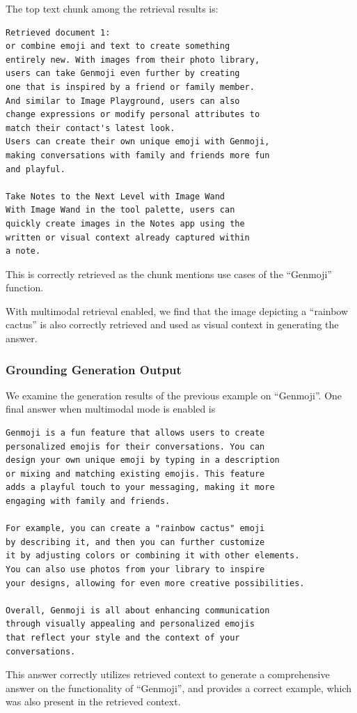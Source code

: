The top text chunk among the retrieval results is:
\begin{verbatim}
Retrieved document 1: 
or combine emoji and text to create something 
entirely new. With images from their photo library, 
users can take Genmoji even further by creating 
one that is inspired by a friend or family member. 
And similar to Image Playground, users can also 
change expressions or modify personal attributes to 
match their contact's latest look.
Users can create their own unique emoji with Genmoji, 
making conversations with family and friends more fun 
and playful.

Take Notes to the Next Level with Image Wand
With Image Wand in the tool palette, users can 
quickly create images in the Notes app using the 
written or visual context already captured within 
a note.
\end{verbatim}
This is correctly retrieved as the chunk mentions use cases of the ``Genmoji'' function.

With multimodal retrieval enabled, we find that the image depicting a ``rainbow cactus'' is also 
correctly retrieved and used as visual context in generating the answer.

\subsubsection{Grounding Generation Output}
\label{sec:groundingtest}

We examine the generation results of the previous example on ``Genmoji''.
One final answer when multimodal mode is enabled is
\begin{verbatim}
Genmoji is a fun feature that allows users to create 
personalized emojis for their conversations. You can 
design your own unique emoji by typing in a description 
or mixing and matching existing emojis. This feature 
adds a playful touch to your messaging, making it more 
engaging with family and friends.

For example, you can create a "rainbow cactus" emoji 
by describing it, and then you can further customize 
it by adjusting colors or combining it with other elements. 
You can also use photos from your library to inspire 
your designs, allowing for even more creative possibilities.

Overall, Genmoji is all about enhancing communication 
through visually appealing and personalized emojis 
that reflect your style and the context of your 
conversations.
\end{verbatim}
This answer correctly utilizes retrieved context to generate a comprehensive answer on the functionality of ``Genmoji'',
and provides a correct example, which was also present in the retrieved context.


